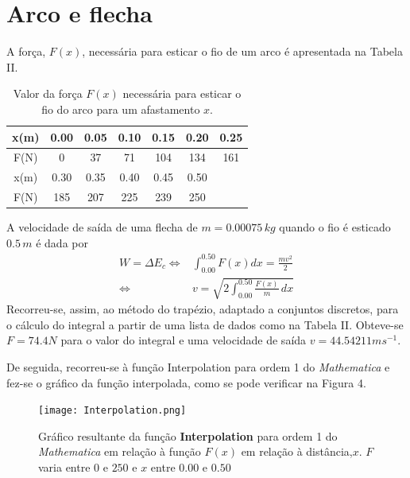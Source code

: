 \documentclass[aps,pre,twocolumn,showpacs,amsmath,amssymb]{revtex4-1}
\begin{document}
\section{Arco e flecha}
A força, $F(x)$, necessária para esticar o fio de um arco é apresentada na Tabela II.\\
\begin{table}[hbt!]
\caption{Valor da força $F(x)$ necessária para esticar o fio do arco para um afastamento $x$.}
\begin{tabular}{|c||c|c|c|c|c|c|}
    \hline
x(m) & 0.00 & 0.05 & 0.10 & 0.15 & 0.20 & 0.25 \\ \hline
F(N) & 0 & 37 & 71 & 104 & 134 & 161 \\ \hline \hline
x(m) & 0.30 & 0.35 & 0.40 & 0.45 & 0.50 & \\ \hline
F(N) & 185 & 207 & 225 & 239 & 250 &  \\ \hline
\end{tabular}
\end{table}
A velocidade de saída de uma flecha de $m=0.00075\,kg$ quando o fio é esticado $0.5\,m$ é dada por
\begin{equation}
\begin{split}
    W = \Delta E_c  \iff &\int_{0.00}^{0.50}F(x)dx = \frac{m v^2}{2}
    \\
    \iff &v=\sqrt{2\int_{0.00}^{0.50}\frac{F(x)}{m}\,dx}
\end{split}
\end{equation}
Recorreu-se, assim, ao método do trapézio, adaptado a conjuntos discretos, para o cálculo do integral a partir de uma lista de dados como na Tabela II. Obteve-se $F = 74.4 N$  para o valor do integral e uma velocidade de saída $v = 44.54211 ms^{-1}$.\par
De seguida, recorreu-se à função Interpolation para ordem 1 do \textit{Mathematica} e fez-se o gráfico da função interpolada, como se pode verificar na Figura 4.
\begin{figure}[hbt!]
   \begin{center}
    \texttt{[image: Interpolation.png]} \\
\caption{Gráfico resultante da função \textbf{Interpolation} para ordem 1 do \textit{Mathematica} em relação à função $F(x)$ em relação à distância,$x$. $F$ varia entre $0$ e $250$ e $x$ entre $0.00$ e $0.50$}
   \end{center}
  \end{figure}
\end{document}
